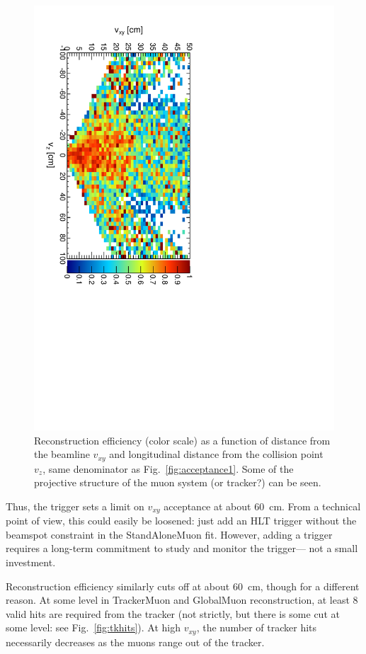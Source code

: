 \documentclass[12pt]{article}
\begin{document}
\begin{figure}
\begin{center}
\includegraphics[height=0.8\linewidth, angle=90]{fig/acceptance5_plot/dispvert_vs_dispz.pdf}
\end{center}

\caption{Reconstruction efficiency (color scale) as a function of
  distance from the beamline $v_{xy}$ and longitudinal distance from
  the collision point $v_z$, same denominator as
  Fig.~\ref{fig:acceptance1}.  Some of the projective structure of the
  muon system (or tracker?) can be
  seen. \label{fig:dispvert_vs_dispz}}
\end{figure}

Thus, the trigger sets a limit on $v_{xy}$ acceptance at about 60~cm.
From a technical point of view, this could easily be loosened: just
add an HLT trigger without the beamspot constraint in the
StandAloneMuon fit.  However, adding a trigger requires a long-term
commitment to study and monitor the trigger--- not a small investment.

Reconstruction efficiency similarly cuts off at about 60~cm, though
for a different reason.  At some level in TrackerMuon and GlobalMuon
reconstruction, at least 8 valid hits are required from the tracker (not
strictly, but there is some cut at some level: see
Fig.~\ref{fig:tkhits}).  At high $v_{xy}$, the number of tracker hits
necessarily decreases as the muons range out of the tracker.
\end{document}
